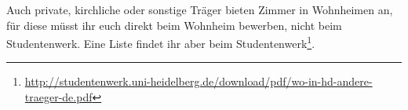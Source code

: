 Auch private, kirchliche oder sonstige Träger bieten Zimmer in Wohnheimen an, für
diese müsst ihr euch direkt beim Wohnheim bewerben, nicht beim Studentenwerk. Eine
Liste findet ihr aber beim Studentenwerk\footnote{\url{http://studentenwerk.uni-heidelberg.de/download/pdf/wo-in-hd-andere-traeger-de.pdf}}.

